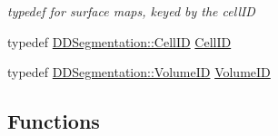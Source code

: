 \begin{DoxyCompactItemize}
\begin{DoxyCompactList}\small\item\em typedef for surface maps, keyed by the cellID \item\end{DoxyCompactList}\item 
typedef \hyperlink{namespace_d_d4hep_1_1_d_d_segmentation_ac7af071d85cb48820914434a07e21ba1}{DDSegmentation::CellID} \hyperlink{namespace_d_d4hep_1_1_d_d_rec_af5cecc2e566eeaedb430b92df23971d4}{CellID}
\item 
typedef \hyperlink{namespace_d_d4hep_1_1_d_d_segmentation_a61a6833a18d1800bdef176595f83e3ba}{DDSegmentation::VolumeID} \hyperlink{namespace_d_d4hep_1_1_d_d_rec_a5b5fea15b3678944e1aba487a746bdcb}{VolumeID}
\end{DoxyCompactItemize}
\subsection*{Functions}

